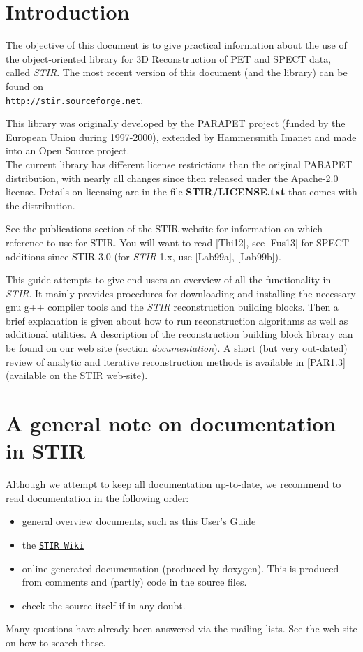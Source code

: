 \documentclass{article}
\def\url#1#2{\mbox{\href{#1}{\tt #2}}}
\begin{document}
\normalsize

\tableofcontents




\section{
Introduction}

The objective of this document is to give practical information 
about the use of the object-oriented library for 3D Reconstruction 
of PET and SPECT data, called \textit{STIR}. The most recent version of this 
document (and the library) can be found on \\
\url{http://stir.sourceforge.net}{http://stir.sourceforge.net}.


This library was originally developed by the PARAPET 
project (funded by the European Union during 1997-2000), extended by Hammersmith 
Imanet and made into an Open Source project. \\
The current library has different license restrictions than the 
original PARAPET distribution, with nearly all changes since then released under the Apache-2.0 license.
Details on licensing are in the file \textbf{STIR/LICENSE.txt} 
that comes with the distribution. 

See the publications section of the STIR website for information on which reference
to use for STIR. You will want to read {[}Thi12], see {[}Fus13] for SPECT additions
since STIR 3.0 (for \textit{STIR} 1.x, use [Lab99a], [Lab99b]).



This guide attempts to give end users an overview of all the functionality
in \textit{STIR}. It mainly provides 
procedures for downloading and installing the necessary gnu g++ 
compiler tools and the \textit{STIR} reconstruction building blocks. 
Then a brief explanation is given about how to run reconstruction 
algorithms as well as additional utilities. A description of 
the reconstruction building block library can be found on our 
web site (section \textit{documentation}). A short (but very out-dated) review of analytic 
and iterative reconstruction methods is available in [PAR1.3] 
(available on the STIR web-site).

\section{
A general note on documentation in STIR}

Although we attempt to keep all documentation up-to-date, we 
recommend to read documentation in the following order:
\begin{itemize}
\item general overview documents, such as this User's Guide
\item the \url{https://github.com/UCL/STIR/wiki/}{STIR Wiki}
\item 
online generated documentation (produced by doxygen). This is 
produced from comments and (partly) code in the source files.
\item check the source itself if in any doubt.
\end{itemize}
Many questions have already been answered via the mailing lists. See the
web-site on how to search these.
\end{document}
